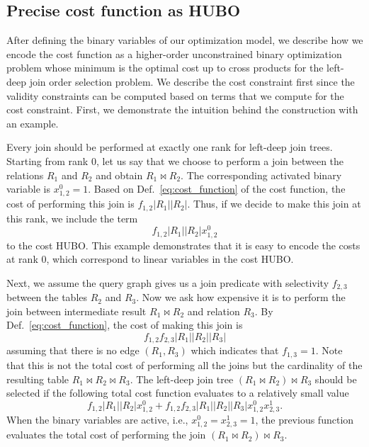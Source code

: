 \subsection{Precise cost function as HUBO}\label{subsection:cost_function}

After defining the binary variables of our optimization model, we describe how we encode the cost function as a higher-order unconstrained binary optimization problem whose minimum is the optimal cost up to cross products for the left-deep join order selection problem. We describe the cost constraint first since the validity constraints can be computed based on terms that we compute for the cost constraint. First, we demonstrate the intuition behind the construction with an example.

\begin{example}\label{ex:example2}
Every join should be performed at exactly one rank for left-deep join trees. Starting from rank $0$, let us say that we choose to perform a join between the relations $R_1$ and $R_2$ and obtain $R_1 \bowtie R_2$. The corresponding activated binary variable is $x_{1,2}^{0} = 1$. Based on Def.~\eqref{eq:cost_function} of the cost function, the cost of performing this join is $f_{1,2}|R_1||R_2|$. Thus, if we decide to make this join at this rank, we include the term
\begin{equation*}
    f_{1,2}|R_1||R_2|x_{1,2}^{0}
\end{equation*}
to the cost HUBO. This example demonstrates that it is easy to encode the costs at rank $0$, which correspond to linear variables in the cost HUBO.

Next, we assume the query graph gives us a join predicate with selectivity $f_{2,3}$ between the tables $R_2$ and $R_3$. Now we ask how expensive it is to perform the join between intermediate result $R_1 \bowtie R_2$ and relation $R_3$. By Def.~\eqref{eq:cost_function}, the cost of making this join is
\begin{equation}\label{eq:card_123}
    f_{1,2}f_{2,3}|R_1||R_2||R_3|
\end{equation}
assuming that there is no edge $(R_1, R_3)$ which indicates that $f_{1,3} = 1$. Note that this is not the total cost of performing all the joins but the cardinality of the resulting table $R_1 \bowtie R_2 \bowtie R_3$. The left-deep join tree $(R_1 \bowtie R_2) \bowtie R_3$ should be selected if the following total cost function evaluates to a relatively small value
\begin{equation*}
    f_{1,2}|R_1||R_2|x_{1,2}^{0} + f_{1,2}f_{2,3}|R_1||R_2||R_3|x_{1,2}^{0}x_{2,3}^{1}.
\end{equation*}
When the binary variables are active, i.e., $x_{1,2}^{0} = x_{2,3}^{1} = 1$, the previous function evaluates the total cost of performing the join $(R_1 \bowtie R_2) \bowtie R_3$.


\end{example}
